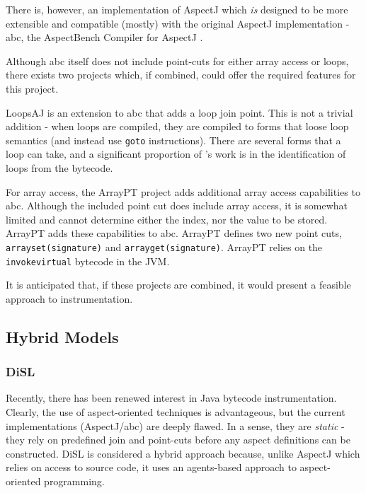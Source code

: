                 There is, however, an implementation of AspectJ which \emph{is} designed to be more extensible and compatible (mostly) with the original AspectJ implementation - abc, the AspectBench Compiler for AspectJ \citep{Allan2005}.

                Although abc itself does not include point-cuts for either array access or loops, there exists two projects which, if combined, could offer the required features for this project.

                LoopsAJ \citep{Harbulot2005} is an extension to abc that adds a loop join point. This is not a trivial addition - when loops are compiled, they are compiled to forms that loose loop semantics (and instead use \texttt{goto} instructions). There are several forms that a loop can take, and a significant proportion of \citeauthor{Harbulot2005}'s work is in the identification of loops from the bytecode.

                For array access, the ArrayPT project \citep{Chen2007} adds additional array access capabilities to abc. Although the included point cut does include array access, it is somewhat limited and cannot determine either the index, nor the value to be stored. ArrayPT adds these capabilities to abc. ArrayPT defines two new point cuts, \texttt{arrayset(signature)} and \texttt{arrayget(signature)}. ArrayPT relies on the \texttt{invokevirtual} bytecode in the JVM.

                It is anticipated that, if these projects are combined, it would present a feasible approach to instrumentation.

        \subsection{Hybrid Models} \label{sec:instrumentation/hybrid}
                \subsubsection{DiSL} \label{sec:instrumentation/hybrid/disl}
                Recently, there has been renewed interest in Java bytecode instrumentation. Clearly, the use of aspect-oriented techniques is advantageous, but the current implementations (AspectJ/abc) are deeply flawed. In a sense, they are \textit{static} - they rely on predefined join and point-cuts before any aspect definitions can be constructed. DiSL is considered a hybrid approach because, unlike AspectJ which relies on access to source code, it uses an agents-based approach to aspect-oriented programming.


